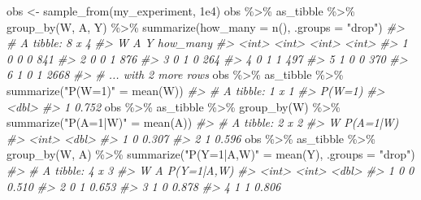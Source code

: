 \documentclass[
  11pt,
  openright,twoside]{book}
\newenvironment{Shaded}{\begin{snugshade}}{\end{snugshade}}
\newcommand{\AttributeTok}[1]{\textcolor[rgb]{0.77,0.63,0.00}{#1}}
\newcommand{\CommentTok}[1]{\textcolor[rgb]{0.56,0.35,0.01}{\textit{#1}}}
\newcommand{\FloatTok}[1]{\textcolor[rgb]{0.00,0.00,0.81}{#1}}
\newcommand{\FunctionTok}[1]{\textcolor[rgb]{0.00,0.00,0.00}{#1}}
\newcommand{\NormalTok}[1]{#1}
\newcommand{\OtherTok}[1]{\textcolor[rgb]{0.56,0.35,0.01}{#1}}
\newcommand{\SpecialCharTok}[1]{\textcolor[rgb]{0.00,0.00,0.00}{#1}}
\newcommand{\StringTok}[1]{\textcolor[rgb]{0.31,0.60,0.02}{#1}}
\theoremstyle{definition}
\theoremstyle{definition}
\theoremstyle{definition}
\theoremstyle{definition}
\theoremstyle{remark}
\begin{document}
\begin{Shaded}
\begin{Highlighting}[]
\NormalTok{obs }\OtherTok{\textless{}{-}} \FunctionTok{sample\_from}\NormalTok{(my\_experiment, }\FloatTok{1e4}\NormalTok{)}
\NormalTok{obs }\SpecialCharTok{\%\textgreater{}\%}\NormalTok{ as\_tibble }\SpecialCharTok{\%\textgreater{}\%} \FunctionTok{group\_by}\NormalTok{(W, A, Y) }\SpecialCharTok{\%\textgreater{}\%}
  \FunctionTok{summarize}\NormalTok{(}\AttributeTok{how\_many =} \FunctionTok{n}\NormalTok{(), }\AttributeTok{.groups =} \StringTok{"drop"}\NormalTok{)}
\CommentTok{\#\textgreater{} \# A tibble: 8 x 4}
\CommentTok{\#\textgreater{}       W     A     Y how\_many}
\CommentTok{\#\textgreater{}   \textless{}int\textgreater{} \textless{}int\textgreater{} \textless{}int\textgreater{}    \textless{}int\textgreater{}}
\CommentTok{\#\textgreater{} 1     0     0     0      841}
\CommentTok{\#\textgreater{} 2     0     0     1      876}
\CommentTok{\#\textgreater{} 3     0     1     0      264}
\CommentTok{\#\textgreater{} 4     0     1     1      497}
\CommentTok{\#\textgreater{} 5     1     0     0      370}
\CommentTok{\#\textgreater{} 6     1     0     1     2668}
\CommentTok{\#\textgreater{} \# ... with 2 more rows}
\NormalTok{obs }\SpecialCharTok{\%\textgreater{}\%}\NormalTok{ as\_tibble }\SpecialCharTok{\%\textgreater{}\%} 
  \FunctionTok{summarize}\NormalTok{(}\StringTok{"P(W=1)"} \OtherTok{=} \FunctionTok{mean}\NormalTok{(W))}
\CommentTok{\#\textgreater{} \# A tibble: 1 x 1}
\CommentTok{\#\textgreater{}   \textasciigrave{}P(W=1)\textasciigrave{}}
\CommentTok{\#\textgreater{}      \textless{}dbl\textgreater{}}
\CommentTok{\#\textgreater{} 1    0.752}
\NormalTok{obs }\SpecialCharTok{\%\textgreater{}\%}\NormalTok{ as\_tibble }\SpecialCharTok{\%\textgreater{}\%} \FunctionTok{group\_by}\NormalTok{(W) }\SpecialCharTok{\%\textgreater{}\%}
  \FunctionTok{summarize}\NormalTok{(}\StringTok{"P(A=1|W)"} \OtherTok{=} \FunctionTok{mean}\NormalTok{(A))}
\CommentTok{\#\textgreater{} \# A tibble: 2 x 2}
\CommentTok{\#\textgreater{}       W \textasciigrave{}P(A=1|W)\textasciigrave{}}
\CommentTok{\#\textgreater{}   \textless{}int\textgreater{}      \textless{}dbl\textgreater{}}
\CommentTok{\#\textgreater{} 1     0      0.307}
\CommentTok{\#\textgreater{} 2     1      0.596}
\NormalTok{obs }\SpecialCharTok{\%\textgreater{}\%}\NormalTok{ as\_tibble }\SpecialCharTok{\%\textgreater{}\%} \FunctionTok{group\_by}\NormalTok{(W, A) }\SpecialCharTok{\%\textgreater{}\%}
  \FunctionTok{summarize}\NormalTok{(}\StringTok{"P(Y=1|A,W)"} \OtherTok{=} \FunctionTok{mean}\NormalTok{(Y), }\AttributeTok{.groups =} \StringTok{"drop"}\NormalTok{)}
\CommentTok{\#\textgreater{} \# A tibble: 4 x 3}
\CommentTok{\#\textgreater{}       W     A \textasciigrave{}P(Y=1|A,W)\textasciigrave{}}
\CommentTok{\#\textgreater{}   \textless{}int\textgreater{} \textless{}int\textgreater{}        \textless{}dbl\textgreater{}}
\CommentTok{\#\textgreater{} 1     0     0        0.510}
\CommentTok{\#\textgreater{} 2     0     1        0.653}
\CommentTok{\#\textgreater{} 3     1     0        0.878}
\CommentTok{\#\textgreater{} 4     1     1        0.806}
\end{Highlighting}
\end{Shaded}
\end{document}
